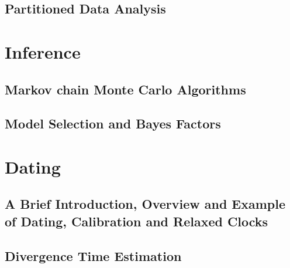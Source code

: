 \documentclass[11pt]{book}
\begin{document}
\chapter{Partitioned Data Analysis}
\def \ResourcePath {RB_Partition_Tutorial/}






\part{Inference}

\chapter{Markov chain Monte Carlo Algorithms}
\def \ResourcePath {RB_MCMC_Tutorial/}


\chapter{Model Selection and Bayes Factors}
\def \ResourcePath {RB_BayesFactor_Tutorial/}






\part{Dating}

\chapter{A Brief Introduction, Overview and Example of Dating, Calibration and Relaxed Clocks}
\def \ResourcePath {RB_Dating_Tutorial/}


\chapter{Divergence Time Estimation}
\def \ResourcePath {RB_DivergenceTime_Tutorial/}


%
\end{document}
